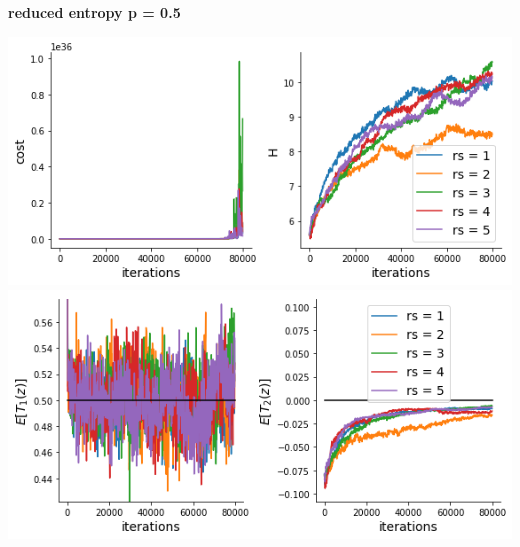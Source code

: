 \documentclass[11pt]{article}
\begin{document}
\textbf{reduced entropy p = 0.5}
\begin{center}
\includegraphics[scale=0.6]{figs/cost_H_SC_reduced_c=15_p=50.png} \\
\includegraphics[scale=0.6]{figs/constraints_SC_reduced_c=15_p=50.png}
\end{center}
\end{document}
